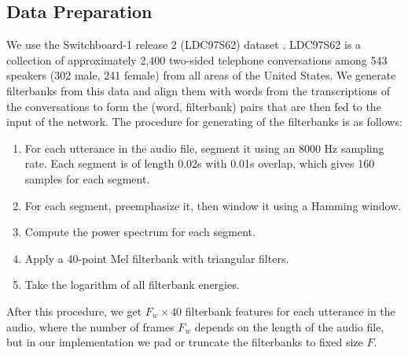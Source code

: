 \documentclass{article}
\begin{document}
\subsection{Data Preparation}
We use the Switchboard-1 release 2 (LDC97S62) dataset \cite{switchboard}. LDC97S62 is a collection of approximately 2,400 two-sided telephone conversations among 543 speakers (302 male, 241 female) from all areas of the United States. We generate filterbanks from this data and align them with words from the transcriptions of the conversations to form the (word, filterbank) pairs that are then fed to the input of the network. The procedure for generating of the filterbanks is as follows: 
\begin{enumerate}[(1)]
\item For each utterance in the audio file, segment it using an 8000 Hz sampling rate. Each segment is of length 0.02s with 0.01s overlap, which gives 160 samples for each segment.
\item For each segment, preemphasize it, then window it using a Hamming window.
\item Compute the power spectrum for each segment.
\item Apply a 40-point Mel filterbank with triangular filters.
\item Take the logarithm of all filterbank energies.
\end{enumerate}
After this procedure, we get $F_w \times 40$ filterbank features for each utterance in the audio, where the number of frames $F_w$ depends on the length of the audio file, but in our implementation we pad or truncate the filterbanks to fixed size $F$.
\end{document}
